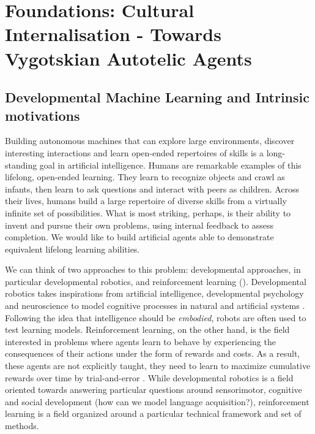 \chapter{Foundations: Cultural Internalisation - Towards Vygotskian Autotelic Agents}
\label{chap:foundation_vaai}
\minitoc

\section{Developmental Machine Learning and Intrinsic motivations}

Building autonomous machines that can explore large environments, discover interesting interactions and learn open-ended repertoires of skills is a long-standing goal in artificial intelligence. Humans are remarkable examples of this lifelong, open-ended learning. They learn to recognize objects and crawl as infants, then learn to ask questions and interact with peers as children. Across their lives, humans build a large repertoire of diverse skills from a virtually infinite set of possibilities. What is most striking, perhaps, is their ability to invent and pursue their own problems, using internal feedback to assess completion. We would like to build artificial agents able to demonstrate equivalent lifelong learning abilities.


We can think of two approaches to this problem: developmental approaches, in particular developmental robotics, and reinforcement learning (\rl). Developmental robotics takes inspirations from artificial intelligence, developmental psychology and neuroscience to model cognitive processes in natural and artificial systems \cite{asada2009cognitive,cangelosi2015developmental}. Following the idea that intelligence should be \textit{embodied}, robots are often used to test learning models. Reinforcement learning, on the other hand, is the field interested in problems where agents learn to behave by experiencing the consequences of their actions under the form of rewards and costs. As a result, these agents are not explicitly taught, they need to learn to maximize cumulative rewards over time by trial-and-error \cite{sutton2018reinforcement}. While developmental robotics is a field oriented towards answering particular questions around sensorimotor, cognitive and social development (\eg how can we model language acquisition?), reinforcement learning is a field organized around a particular technical framework and set of methods.

